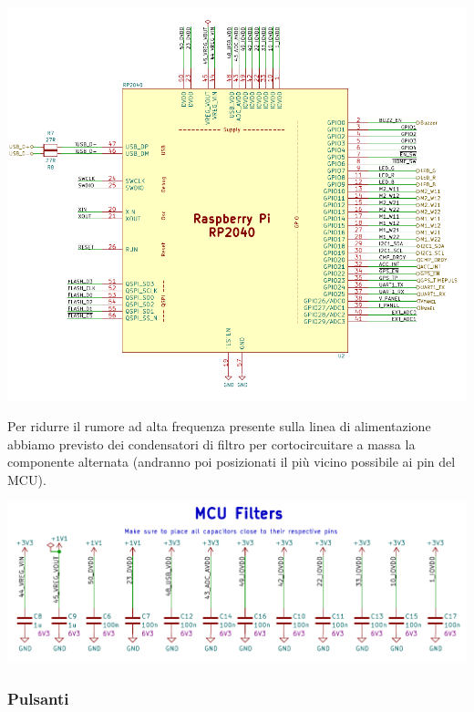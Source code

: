 \begin{center}
\includegraphics[scale=0.45]{figures/image54.png}
\captionsetup{type=figure}
\end{center}

\noindent Per ridurre il rumore ad alta frequenza presente sulla linea di
alimentazione abbiamo previsto dei condensatori di filtro per
cortocircuitare a massa la componente alternata (andranno poi
posizionati il più vicino possibile ai pin del MCU).

\begin{center}
\includegraphics[scale=0.55]{figures/image23.png}
\captionsetup{type=figure}
\end{center}

\hypertarget{pulsanti}{%
\subsubsection{\texorpdfstring{\hfill\break
Pulsanti}{ Pulsanti}}\label{pulsanti}}

